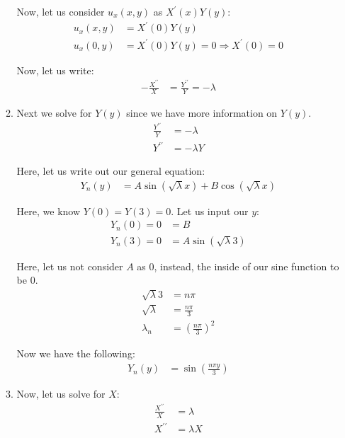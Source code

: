 \documentclass{article}
\begin{document}
\begin{enumerate}
\begin{enumerate}
    Now, let us consider $u_x(x, y)$ as $X^\prime(x)Y(y)$:
    \begin{align}
      u_x(x, y) & = X^\prime(0) Y(y)\\
      u_x(0, y) & = X^\prime(0) Y(y) = 0
      \Rightarrow X^\prime(0) = 0
    \end{align}

    Now, let us write:
    \begin{align}
      - \frac{X^{\prime\prime}}{X} & = \frac{Y^{\prime\prime}}{Y} = - \lambda
    \end{align}
    \item Next we solve for $Y(y)$ since we have more information on $Y(y)$.
    \begin{align}
      \frac{Y^{\prime\prime}}{Y} & = -\lambda\\
      Y^{\prime\prime} & = - \lambda Y
    \end{align}

    Here, let us write out our general equation:
    \begin{align}
      Y_n(y) & = A \sin ( \sqrt \lambda x) + B \cos ( \sqrt \lambda x )
    \end{align}

    Here, we know $Y(0) = Y(3) = 0$. Let us input our $y$:
    \begin{align}
      Y_n(0) = 0 & = B\\
      Y_n(3) = 0 & = A \sin( \sqrt \lambda 3 )
    \end{align}

    Here, let us not consider $A$ as $0$, instead, the inside of our sine function to be $0$.
    \begin{align}
      \sqrt \lambda 3 & = n \pi\\
      \sqrt \lambda & = \frac{n \pi}{3}\\
      \lambda_n & = \left( \frac{n \pi}{3} \right)^2
    \end{align}

    Now we have the following:
    \begin{align}
      Y_n(y) & = \sin\left( \frac{n \pi y}{3} \right )
    \end{align}

    \item Now, let us solve for $X$:
    \begin{align}
      \frac{X^{\prime\prime}}{X} & = \lambda\\
      X^{\prime\prime} & = \lambda X
    \end{align}


\end{enumerate}
\end{enumerate}
\end{document}
